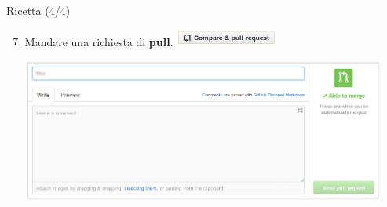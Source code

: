 \documentclass{beamer}
\begin{document}
\begin{frame}{\centerline{Ricetta (4/4)}}
  \begin{enumerate}
    \setcounter{enumi}{6}
  \item Mandare una richiesta di \textbf{pull}.
    \includegraphics[height=0.55cm]{UniBo.IDSEPC.A2023.LavoroCondiviso/github-compare-and-pull-request}
    \begin{center}
      \hbox{\hspace{-0cm}\includegraphics[width=12cm]{UniBo.IDSEPC.A2023.LavoroCondiviso/github-pull-request}}
    \end{center}
  \end{enumerate}
\end{frame}
\end{document}
